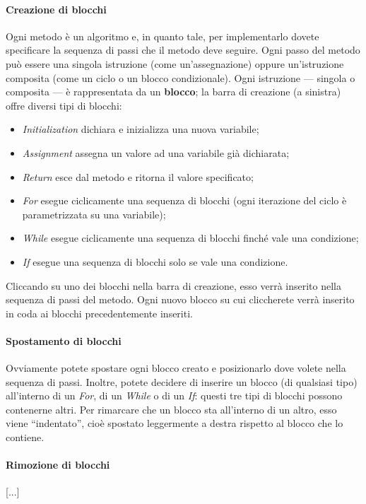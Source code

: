 \paragraph{Creazione di blocchi} Ogni metodo è un algoritmo e, in quanto tale, per implementarlo dovete specificare la sequenza di passi che il metodo deve seguire. Ogni passo del metodo può essere una singola istruzione (come un'assegnazione) oppure un'istruzione composita (come un ciclo o un blocco condizionale). Ogni istruzione --- singola o composita --- è rappresentata da un \textbf{blocco}; la barra di creazione (a sinistra) offre diversi tipi di blocchi:
\begin{itemize}
	\item \emph{Initialization} dichiara e inizializza una nuova variabile;
	\item \emph{Assignment} assegna un valore ad una variabile già dichiarata;
	\item \emph{Return} esce dal metodo e ritorna il valore specificato;
	\item \emph{For} esegue ciclicamente una sequenza di blocchi (ogni iterazione del ciclo è parametrizzata su una variabile);
	\item \emph{While} esegue ciclicamente una sequenza di blocchi finché vale una condizione;
	\item \emph{If} esegue una sequenza di blocchi solo se vale una condizione.
\end{itemize}
Cliccando su uno dei blocchi nella barra di creazione, esso verrà inserito nella sequenza di passi del metodo. Ogni nuovo blocco su cui cliccherete  verrà inserito in coda ai blocchi precedentemente inseriti.

\paragraph{Spostamento di blocchi} Ovviamente potete spostare ogni blocco creato e posizionarlo dove volete nella sequenza di passi. Inoltre, potete decidere di inserire un blocco (di qualsiasi tipo) all'interno di un \emph{For}, di un \emph{While} o di un \emph{If}: questi tre tipi di blocchi possono contenerne altri. Per rimarcare che un blocco sta all'interno di un altro, esso viene “indentato”, cioè spostato leggermente a destra rispetto al blocco che lo contiene.

\paragraph{Rimozione di blocchi} [...] %

